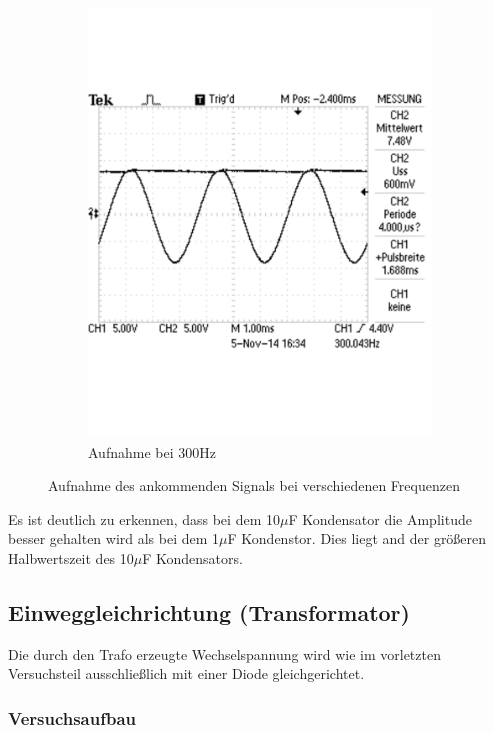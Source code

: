 \documentclass[12pt,a4paper]{article}
\begin{document}
\begin{figure}[H]
\begin{subfigure}[b]{0.48\textwidth}
                \includegraphics[width=\textwidth , scale = 0.4]{2_2_10F_2.pdf}
                \caption[Aufnahme bei 300Hz]{Aufnahme bei 300Hz}
  				\label{fig:2_2_10F_2}
        \end{subfigure}
        \caption{Aufnahme des ankommenden Signals bei verschiedenen Frequenzen}
        \label{fig:2_2_10F}
\end{figure}

Es ist deutlich zu erkennen, dass bei dem 10$\mu$F Kondensator die Amplitude besser gehalten wird als bei dem 1$\mu$F Kondenstor. Dies liegt and der größeren Halbwertszeit des 10$\mu$F Kondensators.

\subsection{Einweggleichrichtung (Transformator)}
Die durch den Trafo erzeugte Wechselspannung wird wie im vorletzten Versuchsteil ausschließlich mit einer Diode gleichgerichtet.
\subsubsection{Versuchsaufbau}
\end{document}
